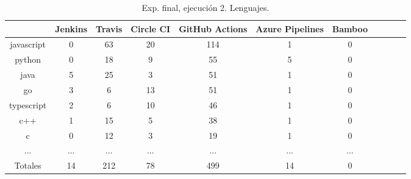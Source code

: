 \begin{table}
  \centering
  \caption{Exp. final, ejecución 2. Lenguajes.}
  \label{tab:tabla_f2_2a}

\begin{footnotesize}
\renewcommand{\arraystretch}{1.5} %
\begin{tabular}{ccccccccccc}
  \hline
  {} &  Jenkins &  Travis &  Circle CI &  GitHub Actions &  Azure Pipelines &  Bamboo \\
  \hline
  javascript    &        0 &      63 &         20 &             114 &                1 &       0 \\
  python        &        0 &      18 &          9 &              55 &                5 &       0 \\
  java          &        5 &      25 &          3 &              51 &                1 &       0 \\
  go            &        3 &       6 &         13 &              51 &                1 &       0 \\
  typescript    &        2 &       6 &         10 &              46 &                1 &       0 \\
  c++           &        1 &      15 &          5 &              38 &                1 &       0 \\
  c             &        0 &      12 &          3 &              19 &                1 &       0 \\
  ...           &      ... &     ... &        ... &             ... &              ... &     ... \\
  \hline
  Totales       &       14 &     212 &         78 &             499 &               14 &       0 \\
 \end{tabular}
\end{footnotesize}

\end{table}

